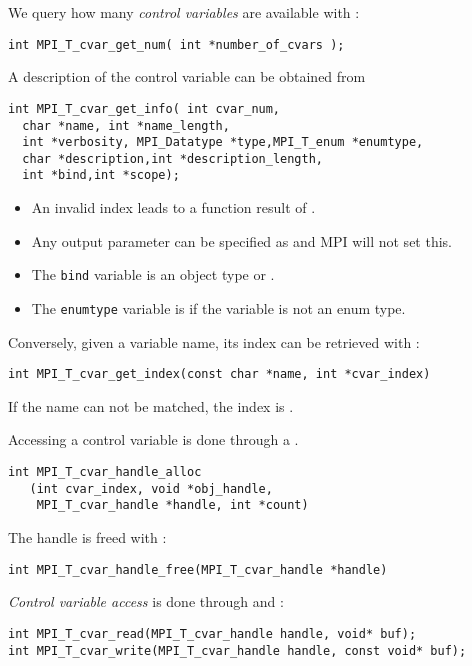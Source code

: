 \begin{mpifour}
We query how many \emph{control variables} are available
with :
\begin{lstlisting}
int MPI_T_cvar_get_num( int *number_of_cvars );
\end{lstlisting}
A description of the control variable can be obtained
from 
\begin{lstlisting}
int MPI_T_cvar_get_info( int cvar_num,
  char *name, int *name_length,
  int *verbosity, MPI_Datatype *type,MPI_T_enum *enumtype,
  char *description,int *description_length,
  int *bind,int *scope);
\end{lstlisting}
\begin{itemize}
\item
  An invalid index leads to a function result of .
\item
  Any output parameter can be specified as 
  and MPI will not set this.
\item
  The \lstinline{bind} variable is an object type or .
\item
  The \lstinline{enumtype} variable is  if the variable
  is not an enum type.
\end{itemize}

Conversely, given a variable name, its index can be retrieved with
:
\begin{lstlisting}
int MPI_T_cvar_get_index(const char *name, int *cvar_index)
\end{lstlisting}
If the name can not be matched, the index is .

Accessing a control variable is done through a
.
\begin{lstlisting}
int MPI_T_cvar_handle_alloc
   (int cvar_index, void *obj_handle,
    MPI_T_cvar_handle *handle, int *count)
\end{lstlisting}
The handle is freed with :
\begin{lstlisting}
int MPI_T_cvar_handle_free(MPI_T_cvar_handle *handle)
\end{lstlisting}

\emph{Control variable access}
is done through  and :
\begin{lstlisting}
int MPI_T_cvar_read(MPI_T_cvar_handle handle, void* buf);
int MPI_T_cvar_write(MPI_T_cvar_handle handle, const void* buf);
\end{lstlisting}


\end{mpifour}
